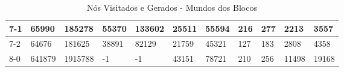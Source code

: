 \begin{table}[H]
\begin{tabular}{l|l|l|l|l|l|l|l|l|l|l|}
\multicolumn{1}{|l|}{7-1}   & 65990      & 185278     & 55370                                & 133602                              & 25511                                     & 55594                                    & 216                                 & 277                               & 2213                                & 3557                              \\ \hline
\multicolumn{1}{|l|}{7-2}   & 64676      & 181625     & 38891                                & 82129                               & 21759                                     & 45321                                    & 127                                 & 183                               & 2808                                & 4358                              \\ \hline
\multicolumn{1}{|l|}{8-0}   & 641879     & 1915788    & -1                                   & -1                                  & 43151                                     & 78721                                    & 210                                 & 256                               & 11498                               & 19168                             \\ \hline
\end{tabular}
\caption{Nós Visitados e Gerados - Mundos dos Blocos}
\label{tab:nosBlocos}
\end{table}